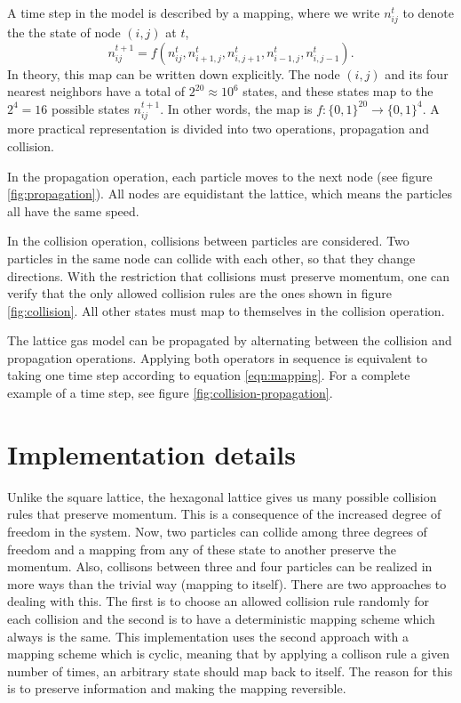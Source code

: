 \documentclass[12pt,a4paper]{article}
\begin{document}
A time step in the model is described by a mapping, where we write $n_{ij}^t$ to denote the the state of node $(i,j)$ at $t$,
\begin{equation}\label{eqn:mapping}
n^{t+1}_{ij} = f(n^t_{ij}, n^t_{i+1,j}, n^t_{i,j+1}, n^t_{i-1,j}, n^t_{i,j-1}).
\end{equation}
In theory, this map can be written down explicitly. The node $(i,j)$ and its four nearest neighbors have a total of $2^{20}\approx 10^6$ states, and these states map to the $2^4=16$ possible states $n^{t+1}_{ij}$. In other words, the map is
$
f: \{0,1\}^{20} \longrightarrow \{0,1\}^4.
$
A more practical representation is divided into two operations, propagation and collision. 

In the propagation operation, each particle moves to the next node (see figure \ref{fig:propagation}). All nodes are equidistant the lattice, which means the particles all have the same speed.

In the collision operation, collisions between particles are considered. Two particles in the same node can collide with each other, so that they change directions. With the restriction that collisions must preserve momentum, one can verify that the only allowed collision rules are the ones shown in figure \ref{fig:collision}. All other states must map to themselves in the collision operation.

The lattice gas model can be propagated by alternating between the collision and propagation operations. Applying both operators in sequence is equivalent to taking one time step according to equation \eqref{eqn:mapping}. For a complete example of a time step, see figure \ref{fig:collision-propagation}.

\section{Implementation details}
\label{sec:imp}

Unlike the square lattice, the hexagonal lattice gives us many possible collision 
rules that preserve momentum. This is a consequence of the increased degree of freedom
in the system. Now, two particles can collide among three degrees of freedom and a mapping
from any of these state to another preserve the momentum. Also, collisons between
three and four particles can be realized in more ways than the trivial way 
(mapping to itself). There are two approaches to dealing with this. The first is to
choose an allowed collision rule randomly for each collision and the second is to
have a deterministic mapping scheme which always is the same. This implementation
uses the second approach with a mapping scheme which is cyclic, meaning that by
applying a collison rule a given number of times, an arbitrary state should map back to
itself. The reason for this is to preserve information and making the mapping reversible.
\end{document}
